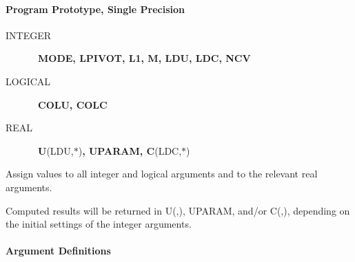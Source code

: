 \documentclass[twoside]{MATH77}
\begin{document}
\paragraph{Program Prototype, Single Precision}

\begin{description}

\item[INTEGER] \ {\bf MODE, LPIVOT, L1, M, LDU, LDC, NCV}

\item[LOGICAL] \ {\bf COLU, COLC}

\item[REAL] \ {\bf U}(LDU,$*$){\bf , UPARAM, C}(LDC,$*$)

\end{description}

Assign values to all integer and logical arguments and to the relevant real
arguments.

\begin{center}
\end{center}

Computed results will be returned in U(,), UPARAM, and/or C(,),
depending on the initial settings of the integer arguments.

\paragraph{Argument Definitions}
\end{document}

